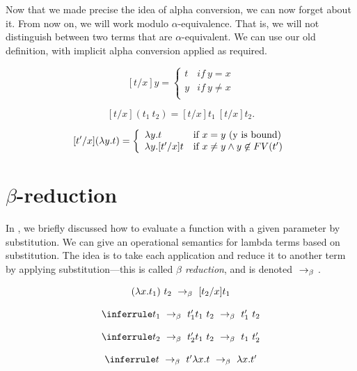 Now that we made precise the idea of alpha conversion, we can now
forget about it.  From now on, we will work modulo
$\alpha$-equivalence.  That is, we will not distinguish between two
terms that are $\alpha$-equivalent.  We can use our old definition,
with implicit alpha conversion applied as required.


\begin{definition}
\label{def:sub3}
\[
[t/x]y = \left\{ \begin{array}{ll}
        t & if~y = x \\
        y & if~y\neq x \\
        \end{array} \right.
\]


\[
[t/x](t_1~t_2) = [t/x]t_1~[t/x]t_2.
 \]

\[
[t'/x](\lambda y.t) = 
\left\{ \begin{array}{ll}

\lambda y.t &\mbox{if}~ x = y \mbox{ (y is bound)} \\

\lambda y.[t'/x]t &\mbox{if}~ x \neq y \land y \not \in FV(t') \\

\end{array} \right. 
\]
\end{definition}


\section{$\beta$-reduction}

In , we briefly discussed how to evaluate a
function with a given parameter by substitution.  We can give an
operational semantics for lambda terms based on substitution.  The
idea is to take each application and reduce it to another term by
applying substitution---this is called \emph{$\beta$ reduction}, and is
denoted $~\rightarrow_{\beta}~$.

\begin{definition}
\[
\begin{array}{c}
(\l x.t_1)~t_2 \redb [t_2/x] t_1 \\[4mm]
\infer{t_1~t_2 \redb t_1'~t_2}{t_1 \redb t'_1}\\[4mm]
\infer{t_1~t_2 \redb t_1~t'_2}{t_2 \redb t'_2}\\[4mm]
\infer{\l x.t \redb \l x.t'} {t \redb t'}
\end{array}
\]
\end{definition}


